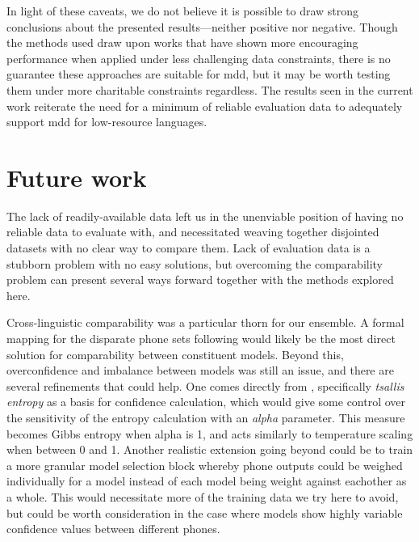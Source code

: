 \documentclass[thesis]{cluu}
\begin{document}
In light of these caveats, we do not believe it is possible to draw strong conclusions about the presented results---neither positive nor negative. Though the methods used draw upon works that have shown more encouraging performance when applied under less challenging data constraints, there is no guarantee these approaches are suitable for \gls{mdd}, but it may be worth testing them under more charitable constraints regardless. The results seen in the current work reiterate the need for a minimum of reliable evaluation data to adequately support \gls{mdd} for low-resource languages.

\chapter{Future work}\label{ch:fw}

The lack of readily-available data left us in the unenviable position of having no reliable data to evaluate with, and necessitated weaving together disjointed datasets with no clear way to compare them. Lack of evaluation data is a stubborn problem with no easy solutions, but overcoming the comparability problem can present several ways forward together with the methods explored here.

Cross-linguistic comparability was a particular thorn for our ensemble. A formal mapping for the disparate phone sets following \textcite{farooqInvestigatingImpactCrosslingual2022} would likely be the most direct solution for comparability between constituent models. Beyond this, overconfidence and imbalance between models was still an issue, and there are several refinements that could help. One comes directly from \textcite{laptevFastEntropyBasedMethods2023}, specifically \textit{tsallis entropy} as a basis for confidence calculation, which would give some control over the sensitivity of the entropy calculation with an \textit{alpha} parameter. This measure becomes Gibbs entropy when alpha is 1, and acts similarly to temperature scaling when between 0 and 1. Another realistic extension going beyond \textcite{gitmanConfidencebasedEnsemblesEndtoEnd2023} could be to train a more granular model selection block whereby phone outputs could be weighed individually for a model instead of each model being weight against eachother as a whole. This would necessitate more of the training data we try here to avoid, but could be worth consideration in the case where models show highly variable confidence values between different phones.
\end{document}
